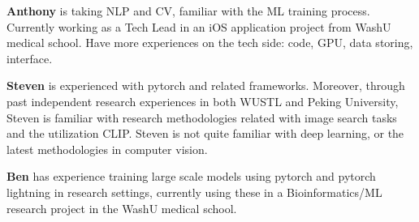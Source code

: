 \documentclass[10pt,twocolumn,letterpaper]{article}
\begin{document}
\textbf{Anthony} is taking NLP and CV, familiar with the ML training process. Currently working as a Tech Lead in an iOS application project from WashU medical school. Have more experiences on the tech side: code, GPU, data storing, interface.

\textbf{Steven} is experienced with pytorch and related frameworks. Moreover, through past independent research experiences in both WUSTL and Peking University, Steven is familiar with research methodologies related with image search tasks and the utilization CLIP. Steven is not quite familiar with deep learning, or the latest methodologies in computer vision.

\textbf{Ben} has experience training large scale models using pytorch and pytorch lightning in research settings, currently using these in a Bioinformatics/ML research project in the WashU medical school.



{\small


}
\end{document}
